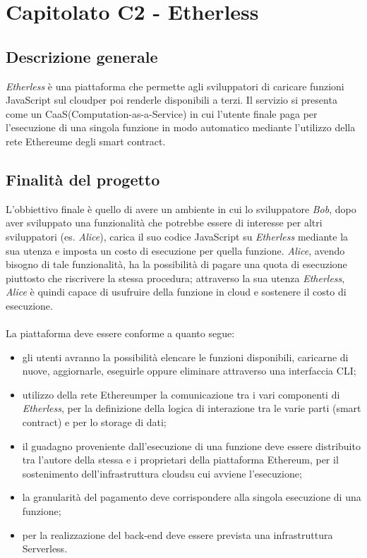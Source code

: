 \section{Capitolato C2 - Etherless}

\subsection{Descrizione generale}
\textit{Etherless} è una piattaforma che permette agli sviluppatori di caricare funzioni JavaScript sul cloud\glo per poi renderle disponibili a terzi. Il servizio si presenta come un CaaS\glo (Computation-as-a-Service) in cui l'utente finale paga per l'esecuzione di una singola funzione in modo automatico mediante l'utilizzo della rete Ethereum\glo e degli smart contract\glos. 
\subsection{Finalità del progetto}
L'obbiettivo finale è quello di avere un ambiente in cui lo sviluppatore \textit{Bob}, dopo aver sviluppato una funzionalità che potrebbe essere di interesse per altri sviluppatori (es. \textit{Alice}), carica il suo codice JavaScript su \textit{Etherless} mediante la sua utenza e imposta un costo di esecuzione per quella funzione. \textit{Alice}, avendo bisogno di tale funzionalità, ha la possibilità di pagare una quota di esecuzione piuttosto che riscrivere la stessa procedura; attraverso la sua utenza \textit{Etherless}, \textit{Alice} è quindi capace di usufruire della funzione in cloud e sostenere il costo di esecuzione.
\\\\
La piattaforma deve essere conforme a quanto segue:
\begin{itemize}
	\item gli utenti avranno la possibilità elencare le funzioni disponibili,  caricarne di nuove, aggiornarle, eseguirle oppure eliminare attraverso una interfaccia CLI\glos;
	\item utilizzo della rete Ethereum\glo per la comunicazione tra i vari componenti di \textit{Etherless}, per la definizione della logica di interazione tra le varie parti (smart contract\glos) e per lo storage di dati;
	\item il guadagno proveniente dall'esecuzione di una funzione deve essere distribuito tra l'autore della stessa e i proprietari della piattaforma Ethereum\glos, per il sostenimento dell'infrastruttura cloud\glo su cui avviene l'esecuzione;
	\item la granularità del pagamento deve corrispondere alla singola esecuzione di una funzione;
	\item per la realizzazione del back-end deve essere prevista una infrastruttura Serverless\glos.
\end{itemize}

